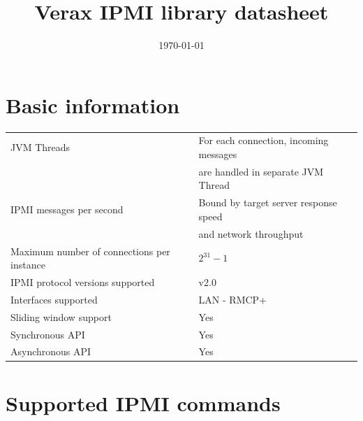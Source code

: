 \documentclass{article}
\title{Verax IPMI library datasheet}
\date{\today}
\begin{document}
\maketitle
\thispagestyle{fancy}
\tableofcontents
\clearpage

\section{Basic information}


\begin{tabular}{|l|l|}
\hline 
JVM Threads & For each connection, incoming messages\\
			& are handled in  separate JVM Thread\\
\hline
IPMI messages per second & Bound by target server response speed\\
						 & and network throughput\\
\hline 
Maximum number of connections per instance & $2^{31} - 1$\\
\hline
IPMI protocol versions supported & v2.0\\
\hline
Interfaces supported & LAN - RMCP+\\
\hline
Sliding window support & Yes\\
\hline
Synchronous API & Yes\\
\hline
Asynchronous API & Yes\\
\hline
\end{tabular}

\section{Supported IPMI commands}
\end{document}
